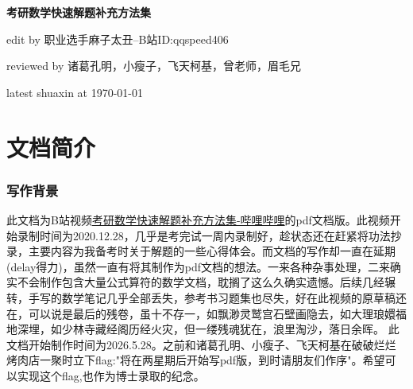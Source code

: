 \documentclass[12pt]{report}
\begin{document}

\begin{titlepage} %
	
	\pagecolor{gray!7}
	
	\centering %
	
	\vspace*{3cm} 
	{\Huge\bfseries 考研数学快速解题补充方法集} 
	
	\vspace{1.5cm} 
	{\Large edit by 职业选手麻子太丑--B站ID:qqspeed406}
	
	\vspace{1cm}
	
	{\large reviewed by 诸葛孔明，小瘦子，飞天柯基，曾老师，眉毛兄}

    \vspace{0.5cm}

	{ latest shuaxin at \today}
	
	
	
	
	
\end{titlepage} %


   \chapter*{文档简介}
   \thispagestyle{empty} %
   \subsection*{\centering 写作背景}
   此文档为B站视频\href{https://b23.tv/R8F4RW5}{考研数学快速解题补充方法集-哔哩哔哩}的pdf文档版。此视频开始录制时间为2020.12.28，几乎是考完试一周内录制好，趁状态还在赶紧将功法抄录，主要内容为我备考时关于解题的一些心得体会。而文档的写作却一直在延期(delay得力)，虽然一直有将其制作为pdf文档的想法。一来各种杂事处理，二来确实不会制作包含大量公式算符的数学文档，耽搁了这么久确实遗憾。后续几经辗转，手写的数学笔记几乎全部丢失，参考书习题集也尽失，好在此视频的原草稿还在，可以说是最后的残卷，虽十不存一，如飘渺灵鹫宫石壁画隐去，如大理琅嬛福地深埋，如少林寺藏经阁历经火灾，但一缕残魂犹在，浪里淘沙，落日余晖。
   此文档开始制作时间为2026.5.28。之前和诸葛孔明、小瘦子、飞天柯基在破破烂烂烤肉店一聚时立下flag:"将在两星期后开始写pdf版，到时请朋友们作序"。希望可以实现这个flag,也作为博士录取的纪念。
   
\end{document}
